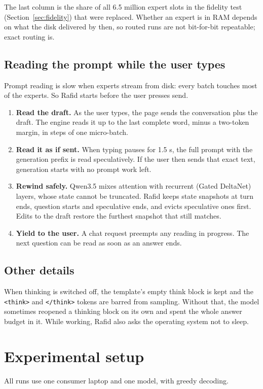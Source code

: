The last column is the share of all 6.5 million expert slots in the fidelity test (Section~\ref{sec:fidelity}) that were replaced. Whether an expert is in RAM depends on what the disk delivered by then, so routed runs are not bit-for-bit repeatable; exact routing is.

\subsection{Reading the prompt while the user types}
Prompt reading is slow when experts stream from disk: every batch touches most of the experts. So Rafid starts before the user presses send.

\begin{enumerate}
  \item \textbf{Read the draft.} As the user types, the page sends the conversation plus the draft. The engine reads it up to the last complete word, minus a two-token margin, in steps of one micro-batch.
  \item \textbf{Read it as if sent.} When typing pauses for 1.5 s, the full prompt with the generation prefix is read speculatively. If the user then sends that exact text, generation starts with no prompt work left.
  \item \textbf{Rewind safely.} Qwen3.5 mixes attention with recurrent (Gated DeltaNet) layers, whose state cannot be truncated. Rafid keeps state snapshots at turn ends, question starts and speculative ends, and evicts speculative ones first. Edits to the draft restore the furthest snapshot that still matches.
  \item \textbf{Yield to the user.} A chat request preempts any reading in progress. The next question can be read as soon as an answer ends.
\end{enumerate}

\subsection{Other details}
When thinking is switched off, the template's empty think block is kept and the \texttt{<think>} and \texttt{</think>} tokens are barred from sampling. Without that, the model sometimes reopened a thinking block on its own and spent the whole answer budget in it. While working, Rafid also asks the operating system not to sleep.

\section{Experimental setup}
All runs use one consumer laptop and one model, with greedy decoding.

